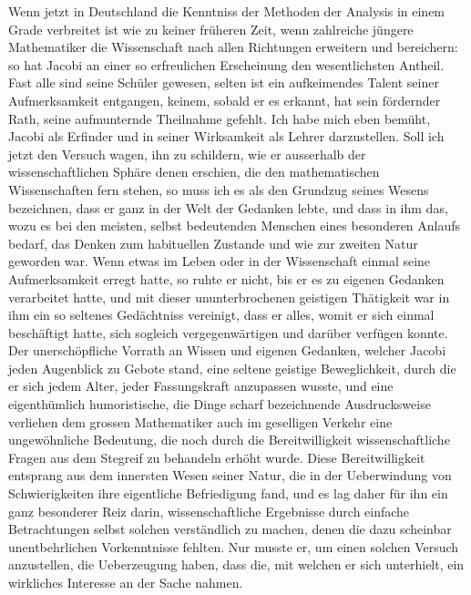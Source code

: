 \documentclass[11pt]{article}
\begin{document}
Wenn jetzt in Deutschland die Kenntniss der Methoden der Analysis in einem Grade verbreitet ist wie zu keiner früheren Zeit, wenn zahlreiche jüngere Mathematiker die Wissenschaft nach allen Richtungen erweitern und bereichern: so hat Jacobi an einer so erfreulichen Erscheinung den wesentlichsten Antheil. Fast alle sind seine Schüler gewesen, selten ist ein aufkeimendes Talent seiner Aufmerksamkeit entgangen, keinem, sobald er es erkannt, hat sein fördernder Rath, seine aufmunternde Theilnahme gefehlt. Ich habe mich eben bemüht, Jacobi als Erfinder und in seiner Wirksamkeit als Lehrer darzustellen. Soll ich jetzt den Versuch wagen, ihn zu schildern, wie er ausserhalb der wissenschaftlichen Sphäre denen erschien, die den mathematischen Wissenschaften fern stehen, so muss ich es als den Grundzug seines Wesens bezeichnen, dass er ganz in der Welt der Gedanken lebte, und dass in ihm das, wozu es bei den meisten, selbst bedeutenden Menschen eines besonderen Anlaufs bedarf, das Denken zum habituellen Zustande und wie zur zweiten Natur geworden war. Wenn etwas im Leben oder in der Wissenschaft einmal seine Aufmerksamkeit erregt hatte, so ruhte er nicht, bis er es zu eigenen Gedanken verarbeitet hatte, und mit dieser ununterbrochenen geistigen Thätigkeit war in ihm ein so seltenes Gedächtniss vereinigt, dass er alles, womit er sich einmal beschäftigt hatte, sich sogleich vergegenwärtigen und darüber verfügen konnte. Der unerschöpfliche Vorrath an Wissen und eigenen Gedanken, welcher Jacobi jeden Augenblick zu Gebote stand, eine seltene geistige Beweglichkeit, durch die er sich jedem Alter, jeder Fassungskraft anzupassen wusste, und eine eigenthümlich humoristische, die Dinge scharf bezeichnende Ausdrucksweise verliehen dem grossen Mathematiker auch im geselligen Verkehr eine ungewöhnliche Bedeutung, die noch durch die Bereitwilligkeit wissenschaftliche Fragen aus dem Stegreif zu behandeln erhöht wurde. Diese Bereitwilligkeit entsprang aus dem innersten Wesen seiner Natur, die in der Ueberwindung von Schwierigkeiten ihre eigentliche Befriedigung fand, und es lag daher für ihn ein ganz besonderer Reiz darin, wissenschaftliche Ergebnisse durch einfache Betrachtungen selbst solchen verständlich zu machen, denen die dazu scheinbar unentbehrlichen Vorkenntnisse fehlten. Nur musste er, um einen solchen Versuch anzustellen, die Ueberzeugung haben, dass die, mit welchen er sich unterhielt, ein wirkliches Interesse an der Sache nahmen.
\end{document}
